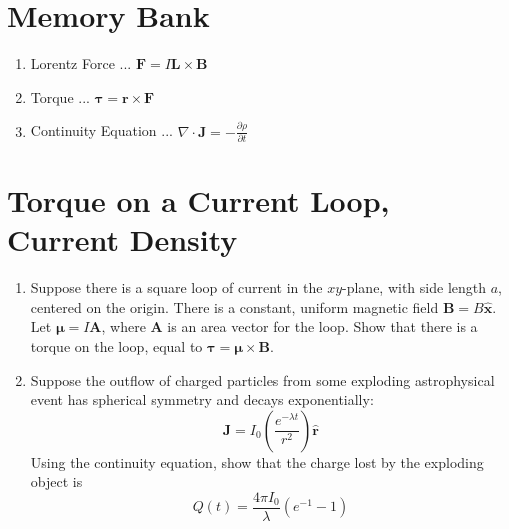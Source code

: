 \documentclass[12pt]{article}
\begin{document}
\maketitle
\small
\section{Memory Bank}
\begin{enumerate}
\item Lorentz Force ... $\mathbf{F} = I \mathbf{L} \times \mathbf{B}$
\item Torque ... $\boldsymbol\tau = \mathbf{r} \times \mathbf{F}$
\item Continuity Equation ... $\nabla \cdot \mathbf{J} = -\frac{\partial \rho}{\partial t}$
\end{enumerate}

\section{Torque on a Current Loop, Current Density}

\begin{enumerate}
\item Suppose there is a square loop of current in the $xy$-plane, with side length $a$, centered on the origin.  There is a constant, uniform magnetic field $\mathbf{B} = B \hat{\mathbf{x}}$.  Let $\boldsymbol\mu = I \mathbf{A}$, where $\mathbf{A}$ is an area vector for the loop.  Show that there is a torque on the loop, equal to $\boldsymbol\tau = \boldsymbol\mu \times \mathbf{B}$. \\ \vspace{5cm}
\item Suppose the outflow of charged particles from some exploding astrophysical event has spherical symmetry and decays exponentially:
\begin{equation}
\mathbf{J} = I_0 \left(\frac{e^{-\lambda t}}{r^2}\right)\hat{\mathbf{r}}
\end{equation}
Using the continuity equation, show that the charge lost by the exploding object is 
\begin{equation}
Q(t) = \frac{4\pi I_0}{\lambda}\left(e^{-1} - 1\right)
\end{equation}
\end{enumerate}
\end{document}
